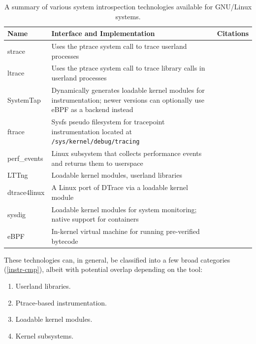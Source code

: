 \documentclass[
  12pt]{findlay}
\providecommand{\tightlist}{%
  \setlength{\itemsep}{0pt}\setlength{\parskip}{0pt}}
\begin{document}
\begin{table}
\caption{A summary of various system introspection technologies available for GNU/Linux systems.}
\label{introspection-summary}
\begin{center}
\begin{tabular}{|l|p{3.8in}|l|}
\hline
\textbf{Name} & \textbf{Interface and Implementation} & \textbf{Citations}\\
\hline
\hline
strace & Uses the ptrace system call to trace userland processes & \cite{strace, manstrace}  \\
\hline
ltrace & Uses the ptrace system call to trace library calls in userland processes & \cite{rubirabranco07, manltrace}  \\
\hline
SystemTap & Dynamically generates loadable kernel modules for instrumentation; newer versions can optionally use eBPF as a backend instead &  \cite{systemtap, merey17}\\
\hline
ftrace & Sysfs pseudo filesystem for tracepoint instrumentation located at \texttt{/sys/kernel/debug/tracing} & \cite{ftrace}\\
\hline
perf\_events & Linux subsystem that collects performance events and returns them to userspace & \cite{manperfeventopen}  \\
\hline
LTTng & Loadable kernel modules, userland libraries & \cite{lttng}\\
\hline
dtrace4linux & A Linux port of DTrace via a loadable kernel module & \cite{dtrace4linux} \\
\hline
sysdig & Loadable kernel modules for system monitoring; native support for containers & \cite{sysdig} \\
\hline
eBPF & In-kernel virtual machine for running pre-verified bytecode & \cite{bcc, goldstein16, starovoitov13} \\
\hline
\end{tabular}
\end{center}
\end{table}

These technologies can, in general, be classified into a few broad
categories (\autoref{instr-cmp}), albeit with potential overlap
depending on the tool:

\begin{enumerate}
\def\labelenumi{(\arabic{enumi})}
\tightlist
\item
  Userland libraries.
\item
  Ptrace-based instrumentation.
\item
  Loadable kernel modules.
\item
  Kernel subsystems.
\end{enumerate}
\end{document}
